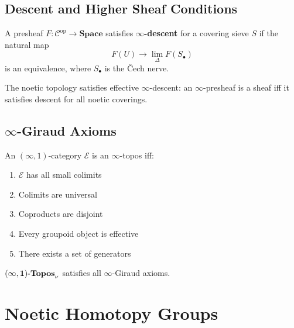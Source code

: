 \section{Descent and Higher Sheaf Conditions}

\begin{definition}
\label{def:infty-descent}
A presheaf $F : \mathcal{C}^{\mathrm{op}} \to \mathbf{Space}$ satisfies \textbf{$\infty$-descent}
for a covering sieve $S$ if the natural map
\[
F(U) \to \lim_{\Delta} F(S_\bullet)
\]
is an equivalence, where $S_\bullet$ is the \v{C}ech nerve.
\end{definition}

\begin{theorem}
\label{thm:noetic-descent}
The noetic topology satisfies effective $\infty$-descent: an $\infty$-presheaf
is a sheaf iff it satisfies descent for all noetic coverings.
\end{theorem}

\section{$\infty$-Giraud Axioms}

\begin{theorem}
\label{thm:infty-giraud}
An $(\infty,1)$-category $\mathcal{E}$ is an $\infty$-topos iff:
\begin{enumerate}[label=(G\arabic*)]
  \item $\mathcal{E}$ has all small colimits
  \item Colimits are universal
  \item Coproducts are disjoint
  \item Every groupoid object is effective
  \item There exists a set of generators
\end{enumerate}
\end{theorem}

\begin{corollary}
\label{cor:noe-giraud}
$\mathbf{(\infty,1)\text{-}Topos}_\nu$ satisfies all $\infty$-Giraud axioms.
\end{corollary}


\chapter{Noetic Homotopy Groups}
\label{ch:noetic-homotopy}

